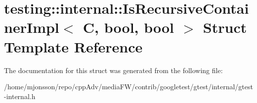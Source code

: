 \hypertarget{structtesting_1_1internal_1_1IsRecursiveContainerImpl}{}\section{testing\+:\+:internal\+:\+:Is\+Recursive\+Container\+Impl$<$ C, bool, bool $>$ Struct Template Reference}
\label{structtesting_1_1internal_1_1IsRecursiveContainerImpl}


The documentation for this struct was generated from the following file\+:\begin{DoxyCompactItemize}
\item 
/home/mjonsson/repo/cpp\+Adv/media\+F\+W/contrib/googletest/gtest/internal/gtest-\/internal.\+h\end{DoxyCompactItemize}

